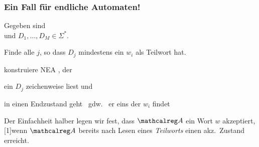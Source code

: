     \begin{frame}
      \frametitle{Ein Fall für endliche Automaten!}
      
      \begin{exampleblock}{}
        Gegeben sind  \\
        und  $D_1,\dots,D_M \in \Sigma^*$.
        \par\smallskip
        Finde alle $j$, so dass $D_j$ mindestens ein $w_i$ als Teilwort hat.
      \end{exampleblock}
      
      \bigskip
       konstruiere NEA , der
      \begin{Itemize}
        \item
          ein $D_j$ zeichenweise liest und
        \item
          in einen Endzustand geht ~gdw.~ er eins der $w_i$ findet
      \end{Itemize}
    
      Der Einfachheit halber legen wir fest, dass $\Aut{A}$ ein Wort $w$ akzeptiert, \\
      \scalebox{.95}[1]{wenn $\Aut{A}$ bereits nach Lesen eines \emph{Teilworts} einen akz.\ Zustand erreicht.}
      
      \medskip


    \end{frame}


